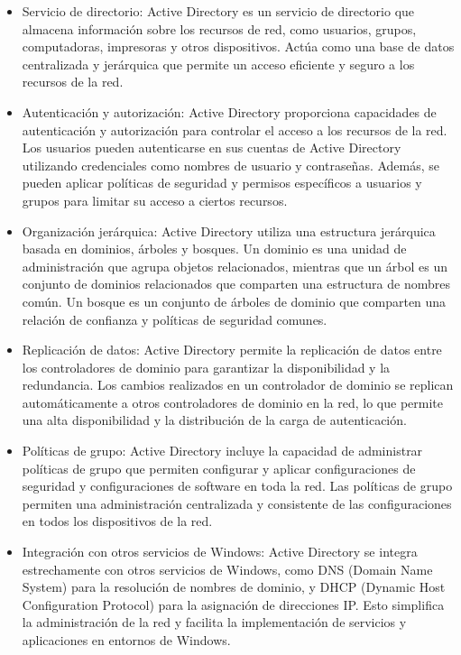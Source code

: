 \documentclass[a4paper, 12pt]{book}
\begin{document}
\begin{itemize}
 
\item Servicio de directorio: Active Directory es un servicio de directorio que almacena información sobre los recursos de red, como usuarios, grupos, computadoras, impresoras y otros dispositivos. Actúa como una base de datos centralizada y jerárquica que permite un acceso eficiente y seguro a los recursos de la red.

\item Autenticación y autorización: Active Directory proporciona capacidades de autenticación y autorización para controlar el acceso a los recursos de la red. Los usuarios pueden autenticarse en sus cuentas de Active Directory utilizando credenciales como nombres de usuario y contraseñas. Además, se pueden aplicar políticas de seguridad y permisos específicos a usuarios y grupos para limitar su acceso a ciertos recursos.

\item Organización jerárquica: Active Directory utiliza una estructura jerárquica basada en dominios, árboles y bosques. Un dominio es una unidad de administración que agrupa objetos relacionados, mientras que un árbol es un conjunto de dominios relacionados que comparten una estructura de nombres común. Un bosque es un conjunto de árboles de dominio que comparten una relación de confianza y políticas de seguridad comunes.

\item Replicación de datos: Active Directory permite la replicación de datos entre los controladores de dominio para garantizar la disponibilidad y la redundancia. Los cambios realizados en un controlador de dominio se replican automáticamente a otros controladores de dominio en la red, lo que permite una alta disponibilidad y la distribución de la carga de autenticación.

\item Políticas de grupo: Active Directory incluye la capacidad de administrar políticas de grupo que permiten configurar y aplicar configuraciones de seguridad y configuraciones de software en toda la red. Las políticas de grupo permiten una administración centralizada y consistente de las configuraciones en todos los dispositivos de la red.

\item Integración con otros servicios de Windows: Active Directory se integra estrechamente con otros servicios de Windows, como DNS (Domain Name System) para la resolución de nombres de dominio, y DHCP (Dynamic Host Configuration Protocol) para la asignación de direcciones IP. Esto simplifica la administración de la red y facilita la implementación de servicios y aplicaciones en entornos de Windows.
\end{itemize}
\end{document}
